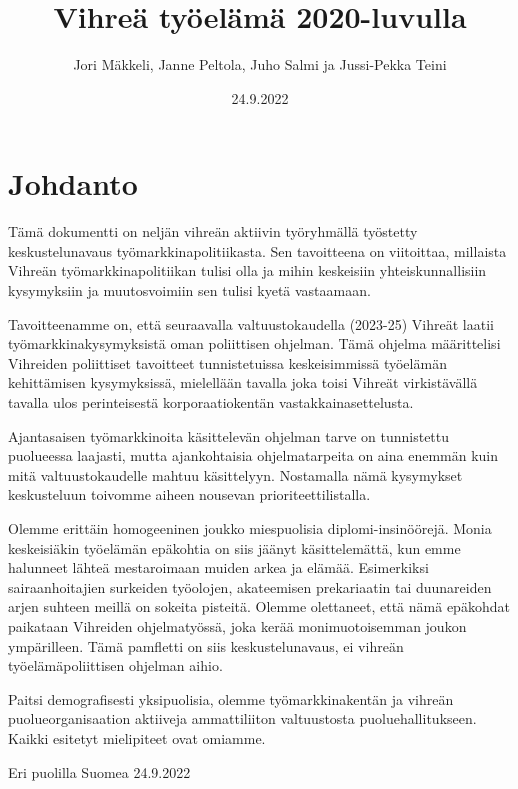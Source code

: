 \documentclass[nobib,finnish,oneside,openany,notoc,a4paper]{tufte-book}
\title{Vihreä työelämä 2020-luvulla}
\author{Jori Mäkkeli, Janne Peltola, Juho Salmi ja
  Jussi-Pekka Teini}
\date{24.9.2022}
\begin{document}
\maketitle

\chapter{Johdanto}

Tämä dokumentti on neljän vihreän aktiivin työryhmällä työstetty keskustelunavaus työmarkkinapolitiikasta. Sen tavoitteena on viitoittaa, millaista Vihreän työmarkkinapolitiikan tulisi olla ja mihin keskeisiin yhteiskunnallisiin kysymyksiin ja muutosvoimiin sen tulisi kyetä vastaamaan. 

Tavoitteenamme on, että seuraavalla valtuustokaudella (2023-25) Vihreät laatii työmarkkinakysymyksistä oman poliittisen ohjelman. Tämä ohjelma määrittelisi Vihreiden poliittiset tavoitteet tunnistetuissa keskeisimmissä työelämän kehittämisen kysymyksissä, mielellään tavalla joka toisi Vihreät virkistävällä tavalla ulos perinteisestä korporaatiokentän vastakkainasettelusta.

Ajantasaisen työmarkkinoita käsittelevän ohjelman tarve on tunnistettu puolueessa laajasti, mutta ajankohtaisia ohjelmatarpeita on aina enemmän kuin mitä valtuustokaudelle mahtuu käsittelyyn. Nostamalla nämä kysymykset keskusteluun toivomme aiheen nousevan prioriteettilistalla. 

Olemme erittäin homogeeninen joukko miespuolisia diplomi-insinöörejä.  Monia keskeisiäkin työelämän epäkohtia on siis jäänyt käsittelemättä, kun emme halunneet lähteä mestaroimaan muiden arkea ja elämää. Esimerkiksi sairaanhoitajien surkeiden työolojen, akateemisen prekariaatin tai duunareiden arjen suhteen meillä on sokeita pisteitä. Olemme olettaneet, että nämä epäkohdat paikataan Vihreiden ohjelmatyössä, joka kerää monimuotoisemman joukon ympärilleen. Tämä pamfletti on siis keskustelunavaus, ei vihreän työelämäpoliittisen ohjelman aihio. 

Paitsi demografisesti yksipuolisia, olemme työmarkkinakentän ja vihreän puolueorganisaation aktiiveja ammattiliiton valtuustosta puoluehallitukseen. Kaikki esitetyt mielipiteet ovat omiamme.

Eri puolilla Suomea 24.9.2022
\end{document}
